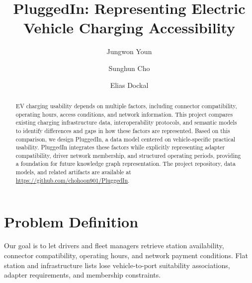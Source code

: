 \documentclass[sigconf,screen,nonacm]{acmart}
\begin{document}
\lstset{
    basicstyle=\ttfamily\footnotesize,
    aboveskip=4pt,
    belowskip=4pt
}

\title{PluggedIn: Representing Electric Vehicle Charging Accessibility}

\author{Jungwon Youn}

\author{Sunghun Cho}

\author{Elias Dockal}

\renewcommand{\shortauthors}{Youn, Cho, and Dockal}

\begin{abstract}
EV charging usability depends on multiple factors, including connector compatibility, operating hours, access conditions, and network information. This project compares existing charging infrastructure data, interoperability protocols, and semantic models to identify differences and gaps in how these factors are represented. Based on this comparison, we design PluggedIn, a data model centered on vehicle-specific practical usability. PluggedIn integrates these factors while explicitly representing adapter compatibility, driver network membership, and structured operating periods, providing a foundation for future knowledge graph representation. The project repository, data models, and related artifacts are available at \url{https://github.com/chohoon901/PluggedIn}.
\end{abstract}


\maketitle

\section{Problem Definition}
Our goal is to let drivers and fleet managers retrieve station availability, connector compatibility, operating hours, and network payment conditions. Flat station and infrastructure lists lose vehicle-to-port suitability associations, adapter requirements, and membership constraints. 
\end{document}
